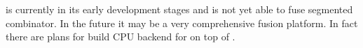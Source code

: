\documentclass[preamble.tex]{subfiles}
\begin{document}
\FlowFusion is currently in its early development stages and is not yet able to fuse segmented combinator. In the future it may be a very comprehensive fusion platform. In fact there are plans for build CPU backend for \Accelerate on top of \FlowFusion.

\end{document}
